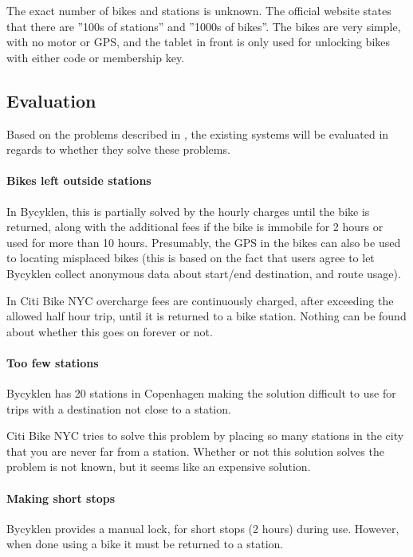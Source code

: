The exact number of bikes and stations is unknown.
The official website states that there are ''100s of stations'' and ''1000s of bikes''\cite{nyc_citibike}.
The bikes are very simple, with no motor or GPS, and the tablet in front is only used for unlocking bikes with either code or membership key.

\subsection{Evaluation}
Based on the problems described in , the existing systems will be evaluated in regards to whether they solve these problems.

\paragraph{Bikes left outside stations}
In Bycyklen, this is partially solved by the hourly charges until the bike is returned, along with the additional fees if the bike is immobile for 2 hours or used for more than 10 hours.
Presumably, the GPS in the bikes can also be used to locating misplaced bikes (this is based on the fact that users agree to let Bycyklen collect anonymous data about start/end destination, and route usage).

In Citi Bike NYC overcharge fees are continuously charged, after exceeding the allowed half hour trip, until it is returned to a bike station.
Nothing can be found about whether this goes on forever or not.

\paragraph{Too few stations}
Bycyklen has 20 stations in Copenhagen making the solution difficult to use for trips with a destination not close to a station. 

Citi Bike NYC tries to solve this problem by placing so many stations in the city that you are never far from a station.
Whether or not this solution solves the problem is not known, but it seems like an expensive solution.

\paragraph{Making short stops}
Bycyklen provides a manual lock, for short stops (2 hours) during use.
However, when done using a bike it must be returned to a station.

